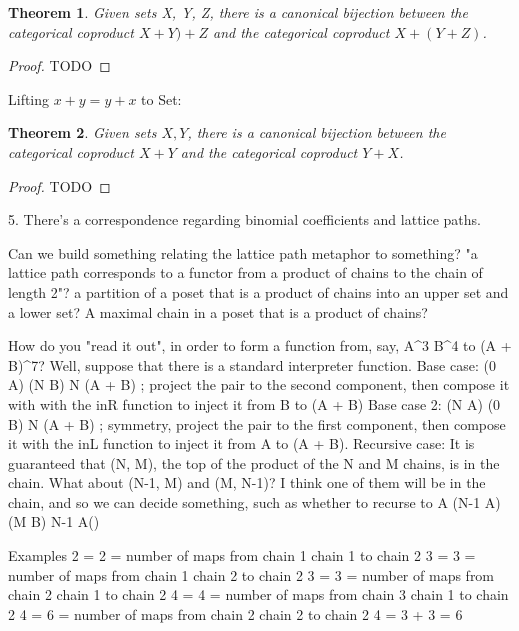 \documentclass{proc-l}
\newtheorem{theorem}{Theorem}[section]
\theoremstyle{definition}
\theoremstyle{remark}
\numberwithin{equation}{section}
\begin{document}
\begin{theorem}
Given sets X, Y, Z, there is a canonical bijection between the categorical coproduct \(X + Y) + Z\) and the categorical coproduct \(X + (Y + Z)\).
\end{theorem}

\begin{proof}
TODO
\end{proof} 


Lifting \(x + y = y + x\) to Set:

\begin{theorem}
Given sets \(X, Y\), there is a canonical bijection between the categorical coproduct \(X + Y\) and the categorical coproduct \(Y + X\).
\end{theorem}

\begin{proof}
TODO
\end{proof}

5. There's a correspondence regarding binomial coefficients and lattice paths.

Can we build something relating the lattice path metaphor to something?
"a lattice path corresponds to a functor from a product of chains to the chain of length 2"?
a partition of a poset that is a product of chains into an upper set and a lower set?
A maximal chain in a poset that is a product of chains?

How do you "read it out", in order to form a function from, say, 
A^3 \times B^4 to (A + B)^7?
Well, suppose that there is a standard interpreter function.
Base case: (0 \to A) \times (N \to B) \to N \to (A + B) ; project the pair to the second component, then compose it with with the inR function to inject it from B to (A + B)
Base case 2: (N \to A) \times (0 \to B) \to N \to (A + B) ; symmetry, project the pair to the first component, then compose it with the inL function to inject it from A to (A + B).
Recursive case: It is guaranteed that (N, M), the top of the product of the N and M chains, is in the chain.
What about (N-1, M) and (M, N-1)? I think one of them will be in the chain, and so we can decide something,
such as whether to recurse to
A \times (N-1 \to A) \times (M \to B) \to N-1 \to A()

Examples
{2 } = 2 = number of maps from chain 1 \times chain 1 to chain 2
{3 } = 3 = number of maps from chain 1 \times chain 2 to chain 2
{3 } = 3 = number of maps from chain 2 \times chain 1 to chain 2
{4 } = 4 = number of maps from chain 3 \times chain 1 to chain 2
{4 } = 6 = number of maps from chain 2 \times chain 2 to chain 2
{4 } = {3 } + {3 } = 6
\end{document}
